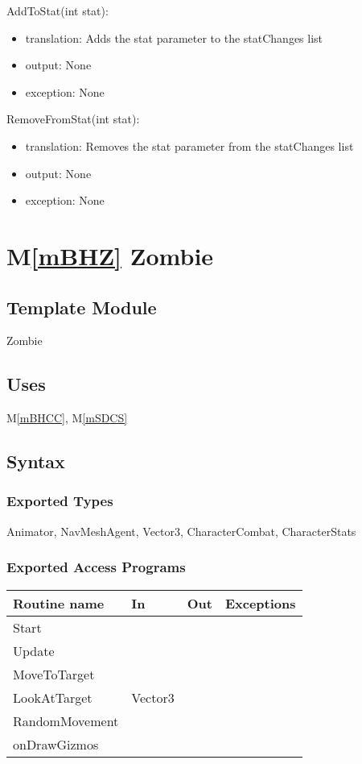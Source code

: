 \documentclass[12pt]{article}
\newcommand{\mref}[1]{M\ref{#1}}
\begin{document}
\noindent AddToStat(int stat):
\begin{itemize}
\item translation: Adds the stat parameter to the statChanges list
\item output: None
\item exception: None
\end{itemize}

\noindent RemoveFromStat(int stat):
\begin{itemize}
\item translation: Removes the stat parameter from the statChanges list
\item output: None
\item exception: None
\end{itemize}

\newpage

\section* {\mref{mBHZ} Zombie}

\subsection*{Template Module}

Zombie

\subsection* {Uses}

\mref{mBHCC}, \mref{mSDCS}

\subsection* {Syntax}

\subsubsection* {Exported Types}

Animator, NavMeshAgent, Vector3, CharacterCombat, CharacterStats

\subsubsection* {Exported Access Programs}

\begin{tabular}{| l | l | l | l |}
\hline
\textbf{Routine name} & \textbf{In} & \textbf{Out} & \textbf{Exceptions}\\
\hline
Start & ~  & ~ & ~\\
Update & ~  & ~ & ~\\
MoveToTarget & ~  & ~ & ~\\
LookAtTarget & Vector3  & ~ & ~\\
RandomMovement & ~  & ~ & ~\\
onDrawGizmos & ~  & ~ & ~\\
\hline
\end{tabular}
\end{document}
